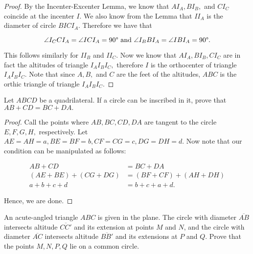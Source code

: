\documentclass[letterpaper,oneside]{scrartcl}
\begin{document}
\begin{proof}  By the Incenter-Excenter Lemma, we know that $AI_A, BI_B,$ and $CI_C$ coincide at the incenter $I$. We also know from the Lemma that $II_A$ is the diameter of circle $BICI_A.$ Therefore we have that

  $$\angle {I_CCI_A} = \angle {ICI_A} =  90\degree \text{ and } \angle {I_BBI_A} = \angle {IBI_A} = 90\degree .$$

  This follows similarly for $II_B$ and $II_C.$ Now we know that $AI_A, BI_B, CI_C$ are in fact the altitudes of triangle $I_AI_BI_C,$ therefore $I$ is the orthocenter of triangle $I_AI_BI_C.$ Note that since $A,B,$ and $C$ are the feet of the altitudes, $ABC$ is the orthic triangle of triangle $I_AI_BI_C.$ \end{proof}

\begin{theorem*}
  Let $ABCD$ be a quadrilateral. If a circle can be inscribed in it, prove that $AB + CD = BC + DA.$
\end{theorem*}

\begin{proof}  Call the points where $AB, BC, CD, DA$ are tangent to the circle $E, F, G, H,$ respectively. Let $AE = AH = a, BE = BF = b, CF = CG = c, DG = DH = d.$ Now note that our condition can be manipulated as follows:

  \begin{align*}
    AB + CD               & = BC + DA               \\
    (AE + BE) + (CG + DG) & = (BF + CF) + (AH + DH) \\
    a + b + c + d         & = b + c + a + d.
  \end{align*}

  Hence, we are done.
\end{proof}

\begin{problem*}
  [2.26, USAMO 1990/5]
  An acute-angled triangle $ABC$ is given in the plane. The circle with diameter $\overline{AB}$ intersects altitude $\overline{CC'}$ and its extension at points $M$ and $N$, and the circle with diameter $\overline{AC}$ intersects altitude $\overline{BB'}$ and its extensions at $P$ and $Q$. Prove that the points $M, N, P , Q$ lie on a common circle.
\end{problem*}
\end{document}
